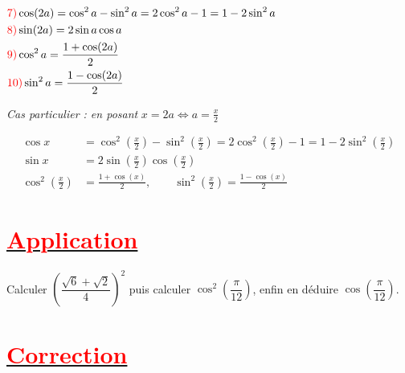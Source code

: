 \documentclass[a4paper,12pt]{article}
\begin{document}
\(
\begin{aligned}
     & \textcolor{red}{\text{7)}}\cos(2a) = \cos^2 a - \sin^2 a = 2\cos^2 a - 1 = 1 - 2\sin^2 a \\
     & \textcolor{red}{\text{8)}} \sin(2a) = 2 \sin a \cos a                                    \\
     & \textcolor{red}{\text{9)}}\cos^2 a = \frac{1 + \cos(2a)}{2}                              \\
     & \textcolor{red}{\text{10)}}\sin^2 a = \frac{1 - \cos(2a)}{2}
\end{aligned}
\)

\vspace{0.5em}
\textit{Cas particulier : en posant } \( x = 2a \Leftrightarrow a = \frac{x}{2} \)

\[
    \begin{aligned}
        \cos x                         & = \cos^2\left(\frac{x}{2}\right) - \sin^2\left(\frac{x}{2}\right)
        = 2 \cos^2\left(\frac{x}{2}\right) - 1 = 1 - 2 \sin^2\left(\frac{x}{2}\right)                      \\
        \sin x                         & = 2 \sin\left(\frac{x}{2}\right) \cos\left(\frac{x}{2}\right)     \\
        \cos^2\left(\frac{x}{2}\right) & = \frac{1 + \cos(x)}{2}, \qquad
        \sin^2\left(\frac{x}{2}\right) = \frac{1 - \cos(x)}{2}
    \end{aligned}
\]

\section*{\underline{\textcolor{red}{Application}}}
\noindent Calculer \( \left(\dfrac{\sqrt{6} + \sqrt{2}}{4}\right)^2 \) puis calculer \( \cos^2\left(\dfrac{\pi}{12}\right) \), enfin en déduire \( \cos\left(\dfrac{\pi}{12}\right) \).\\
\section*{\underline{\textcolor{red}{Correction}}}
\end{document}
